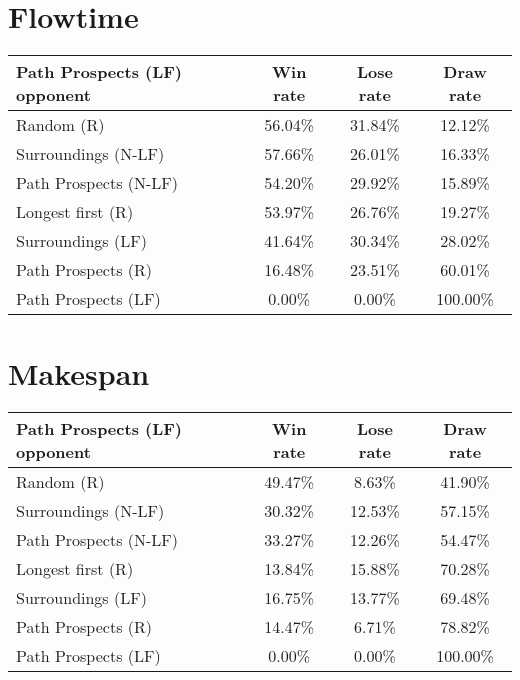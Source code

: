 \documentclass[a4paper]{article}
\begin{document}
\pagestyle{empty} %

\section{Flowtime}
\begin{tabular}{l|ccc}
{\bf Path Prospects (LF) opponent} & {\bf Win rate} & {\bf Lose rate} & {\bf Draw rate}\\
\hline
Random (R) & 56.04\% & 31.84\% & 12.12\% \\
Surroundings (N-LF) & 57.66\% & 26.01\% & 16.33\% \\
Path Prospects (N-LF) & 54.20\% & 29.92\% & 15.89\% \\
Longest first (R) & 53.97\% & 26.76\% & 19.27\% \\
Surroundings (LF) & 41.64\% & 30.34\% & 28.02\% \\
Path Prospects (R) & 16.48\% & 23.51\% & 60.01\% \\
Path Prospects (LF) & 0.00\% & 0.00\% & 100.00\% \\
\end{tabular}
\section{Makespan}
\begin{tabular}{l|ccc}
{\bf Path Prospects (LF) opponent} & {\bf Win rate} & {\bf Lose rate} & {\bf Draw rate}\\
\hline
Random (R) & 49.47\% & 8.63\% & 41.90\% \\
Surroundings (N-LF) & 30.32\% & 12.53\% & 57.15\% \\
Path Prospects (N-LF) & 33.27\% & 12.26\% & 54.47\% \\
Longest first (R) & 13.84\% & 15.88\% & 70.28\% \\
Surroundings (LF) & 16.75\% & 13.77\% & 69.48\% \\
Path Prospects (R) & 14.47\% & 6.71\% & 78.82\% \\
Path Prospects (LF) & 0.00\% & 0.00\% & 100.00\% \\
\end{tabular}
\end{document}
